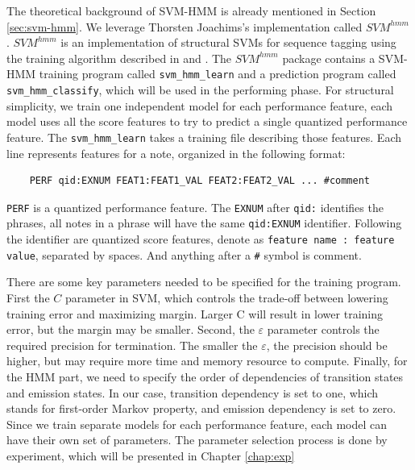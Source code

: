The theoretical background of SVM-HMM is already mentioned in Section \ref{sec:svm-hmm}. We leverage Thorsten Joachims's implementation called $SVM^{hmm}$ \cite{Joachims2008}. $SVM^{hmm}$ is an implementation of structural SVMs for sequence tagging \cite{svm2003} using the training algorithm described in \cite{svm2005} and \cite{svm2009}. The $SVM^{hmm}$ package contains a SVM-HMM training program called \texttt{svm\_hmm\_learn} and a prediction program called \texttt{svm\_hmm\_classify}, which will be used in the performing phase. For structural simplicity, we train one independent model for each performance feature, each model uses all the score features to try to predict a single quantized performance feature. The \texttt{svm\_hmm\_learn} takes a training file describing those features. Each line represents features for a note, organized in the following format:
\begin{lstlisting}
	PERF qid:EXNUM FEAT1:FEAT1_VAL FEAT2:FEAT2_VAL ... #comment
\end{lstlisting}
\texttt{PERF} is a quantized performance feature. The \texttt{EXNUM} after \texttt{qid:} identifies the phrases, all notes in a phrase will have the same \texttt{qid:EXNUM} identifier. Following the identifier are quantized score features, denote as \texttt{feature name : feature value}, separated by spaces. And anything after a \texttt{\#} symbol is comment.  %



There are some key parameters needed to be specified for the training program. First the $C$ parameter in SVM, which controls the trade-off between lowering training error and maximizing margin. Larger C will result in lower training error, but the margin may be smaller. Second, the $\varepsilon$ parameter controls the required precision for termination. The smaller the $\varepsilon$, the precision should be higher, but may require more time and memory resource to compute. Finally, for the HMM part, we need to specify the order of dependencies of transition states and emission states. In our case, transition dependency is set to one, which stands for first-order Markov property, and emission dependency is set to zero. Since we train separate models for each performance feature, each model can have their own set of parameters. The parameter selection process is done by experiment, which will be presented in Chapter \ref{chap:exp}

